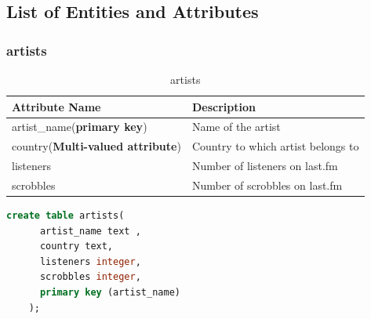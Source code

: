 \documentclass[10pt]{article}
\begin{document}
\subsection{List of Entities and Attributes}
\subsubsection{artists}
\label{sec:1.3.1}
\begin{table}[!ht]
    \centering
    \begin{tabular}{|l|l|}
         \hline
         \textbf{Attribute Name} & \textbf{Description} \\
         \hline
         artist\_name(\textbf{primary key}) & Name of the artist  \\
         \hline
         country(\textbf{Multi-valued attribute}) & Country to which artist belongs to  \\
         \hline
         listeners & Number of listeners on last.fm \\
         \hline
         scrobbles &  Number of scrobbles on last.fm\\
         \hline
    \end{tabular}
    \caption{artists}
    \label{tab:my_label1}
\end{table}

\begin{lstlisting}[language=SQL,
        deletekeywords={IDENTITY,INT},
        morekeywords={clustered},    
        framesep=10pt,
        framextopmargin=10pt]
    create table artists(
      artist_name text ,
      country text,
      listeners integer,
      scrobbles integer,
      primary key (artist_name)
    );
\end{lstlisting}
\end{document}
